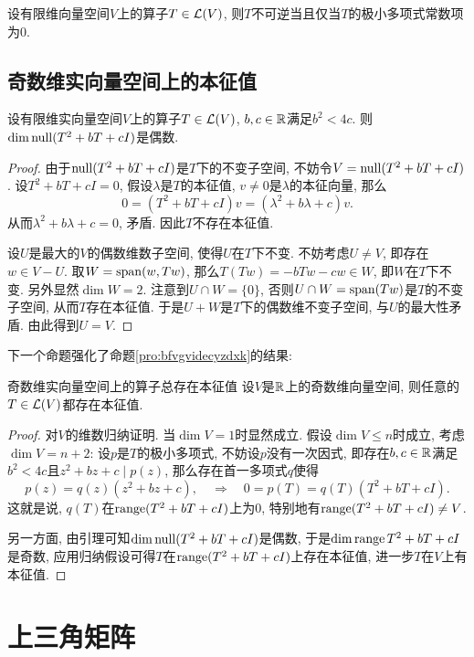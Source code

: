 \begin{proposition}{}
	设有限维向量空间$V$上的算子$T \in \mathcal{L} (V)$, 则$T$不可逆当且仅当$T$的极小多项式常数项为$0$. 
\end{proposition}

\subsection{奇数维实向量空间上的本征值}

\begin{lemma}{}
	设有限维实向量空间$V$上的算子$T \in \mathcal{L} (V)$, $b,c \in \mathbb{R}$满足$b^2<4c$. 则$\dim \operatorname{null} (T^2+bT+cI)$是偶数. 
\end{lemma}
\begin{proof}
	由于$\operatorname{null} (T^2+bT+cI)$是$T$下的不变子空间, 不妨令$V=\operatorname{null} (T^2+bT+cI)$. 设$T^2+bT+cI=0$, 假设$\lambda$是$T$的本征值, $v \neq 0$是$\lambda$的本征向量, 那么$$0 = (T^2+bT+cI)v=(\lambda ^2+b\lambda +c)v.$$
	从而$\lambda ^2+b\lambda +c=0$, 矛盾. 因此$T$不存在本征值. 
	
	设$U$是最大的$V$的偶数维数子空间, 使得$U$在$T$下不变. 不妨考虑$U \neq V$, 即存在$w \in V-U$. 取$W=\operatorname{span} (w,Tw)$, 那么$T(Tw)=-bTw-cw \in W$, 即$W$在$T$下不变. 另外显然$\dim W = 2$. 注意到$U \cap W=\{ 0 \}$, 否则$U \cap W = \operatorname{span} (Tw)$是$T$的不变子空间, 从而$T$存在本征值. 于是$U+W$是$T$下的偶数维不变子空间, 与$U$的最大性矛盾. 由此得到$U=V$. 
\end{proof}

下一个命题强化了命题\ref{pro:bfvgvidecyzdxk}的结果: 

\begin{proposition}{奇数维实向量空间上的算子总存在本征值}
	设$V$是$\mathbb{R}$上的奇数维向量空间, 则任意的$T \in \mathcal{L} (V)$都存在本征值. 
\end{proposition}
\begin{proof}
	对$V$的维数归纳证明. 当$\dim V=1$时显然成立. 假设$\dim V\leq n$时成立, 考虑$\dim V=n+2$: 设$p$是$T$的极小多项式, 不妨设$p$没有一次因式, 即存在$b,c \in \mathbb{R}$满足$b^2<4c$且$z^2+bz+c \mid p(z)$, 那么存在首一多项式$q$使得$$p(z)=q(z)(z^2+bz+c),\quad \Rightarrow \quad 0=p(T)=q(T)(T^2+bT+cI).$$
	这就是说, $q(T)$在$\operatorname{range} (T^2+bT+cI)$上为$0$, 特别地有$\operatorname{range} (T^2+bT+cI) \neq V$. 
	
	另一方面, 由引理可知$\dim \operatorname{null} (T^2+bT+cI)$是偶数, 于是$\dim \operatorname{range} T^2+bT+cI$是奇数, 应用归纳假设可得$T$在$\operatorname{range} (T^2+bT+cI)	$上存在本征值, 进一步$T$在$V$上有本征值. 
\end{proof}


\newpage
\section{上三角矩阵}

